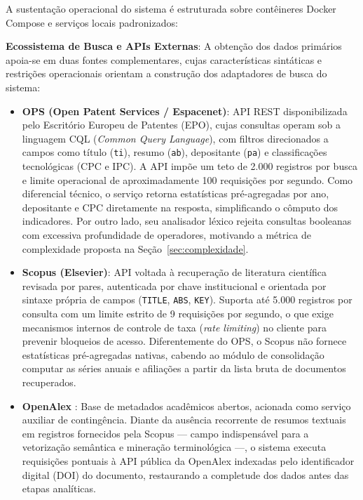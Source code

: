 \documentclass[12pt, a4paper]{article}
\begin{document}
  A sustentação operacional do sistema é estruturada sobre contêineres Docker Compose e serviços locais padronizados:

  \textbf{Ecossistema de Busca e APIs Externas}: A obtenção dos dados primários apoia-se em duas fontes complementares, cujas características sintáticas e restrições operacionais orientam a construção dos adaptadores de busca do sistema:
  \begin{itemize}
    \item \textbf{OPS (Open Patent Services / Espacenet)}: API REST disponibilizada pelo Escritório Europeu de Patentes (EPO), cujas consultas operam sob a linguagem CQL (\textit{Common Query Language}), com filtros direcionados a campos como título (\texttt{ti}), resumo (\texttt{ab}), depositante (\texttt{pa}) e classificações tecnológicas (CPC e IPC). A API impõe um teto de 2.000 registros por busca e limite operacional de aproximadamente 100 requisições por segundo. Como diferencial técnico, o serviço retorna estatísticas pré-agregadas por ano, depositante e CPC diretamente na resposta, simplificando o cômputo dos indicadores. Por outro lado, seu analisador léxico rejeita consultas booleanas com excessiva profundidade de operadores, motivando a métrica de complexidade proposta na Seção~\ref{sec:complexidade}.
    
    \item \textbf{Scopus (Elsevier)}: API voltada à recuperação de literatura científica revisada por pares, autenticada por chave institucional e orientada por sintaxe própria de campos (\texttt{TITLE}, \texttt{ABS}, \texttt{KEY}). Suporta até 5.000 registros por consulta com um limite estrito de 9 requisições por segundo, o que exige mecanismos internos de controle de taxa (\textit{rate limiting}) no cliente para prevenir bloqueios de acesso. Diferentemente do OPS, o Scopus não fornece estatísticas pré-agregadas nativas, cabendo ao módulo de consolidação computar as séries anuais e afiliações a partir da lista bruta de documentos recuperados.
    
    \item \textbf{OpenAlex} \cite{priem2022}: Base de metadados acadêmicos abertos, acionada como serviço auxiliar de contingência. Diante da ausência recorrente de resumos textuais em registros fornecidos pela Scopus --- campo indispensável para a vetorização semântica e mineração terminológica ---, o sistema executa requisições pontuais à API pública da OpenAlex indexadas pelo identificador digital (DOI) do documento, restaurando a completude dos dados antes das etapas analíticas.
  \end{itemize}
\end{document}
